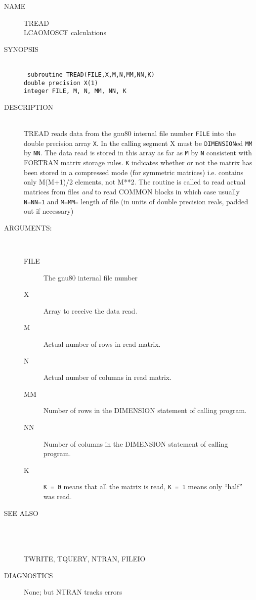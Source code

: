 \newpage
\setcounter{page}{1}
\begin{description}
\item[NAME] TREAD \\
LCAOMOSCF calculations
\item[SYNOPSIS] \ \\
{\tt
   subroutine TREAD(FILE,X,M,N,MM,NN,K) \\
   double precision X(1) \\
   integer FILE, M, N, MM, NN, K \\
}
\item[DESCRIPTION] \ \\
TREAD reads data from the gnu80 internal file number {\tt FILE}
into the double precision array {\tt X}. In the calling segment
X must be {\tt DIMENSION}ed {\tt MM} by {\tt NN}. The data read
is stored in this array as far as {\tt M} by {\tt N} consistent
with FORTRAN matrix storage rules. {\tt K} indicates whether or
not the matrix has been stored in a compressed mode (for symmetric
matrices) i.e. contains only M(M+1)/2 elements, not M**2.
The routine is called to read actual matrices from files {\em and}
to read COMMON blocks in which case usually {\tt N=NN=1}
and {\tt M=MM=} length of file (in units of double precision reals,
padded out if necessary)
\item[ARGUMENTS:] \ \\
\begin{description}
\item[FILE]  The gnu80 internal file number
\item[X] Array to receive the data read.
\item[M] Actual number of rows in read matrix.
\item[N] Actual number of columns in read matrix.
\item[MM] Number of rows in the DIMENSION statement of calling program.
\item[NN] Number of columns in the DIMENSION statement of calling program.
\item[K] {\tt K = 0} means that all the matrix is read, {\tt K = 1}
means only ``half'' was read.
\end{description}
\item[SEE ALSO] \\ \\\\
TWRITE, TQUERY, NTRAN, FILEIO
\item[DIAGNOSTICS]
None; but NTRAN tracks errors
\end{description}
